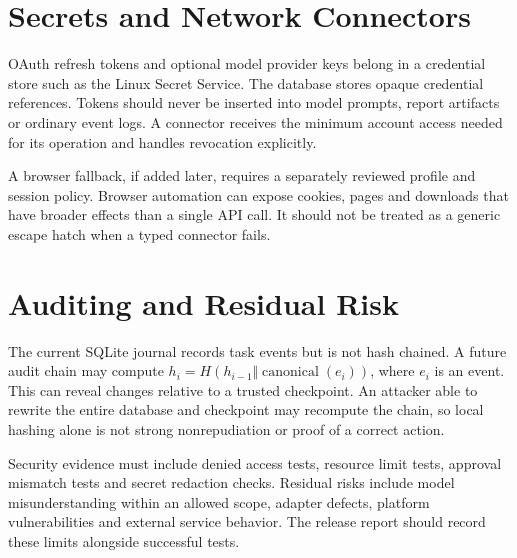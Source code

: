 \section{Secrets and Network Connectors}
OAuth refresh tokens and optional model provider keys belong in a credential store such as the Linux Secret Service. The database stores opaque credential references. Tokens should never be inserted into model prompts, report artifacts or ordinary event logs. A connector receives the minimum account access needed for its operation and handles revocation explicitly.

A browser fallback, if added later, requires a separately reviewed profile and session policy. Browser automation can expose cookies, pages and downloads that have broader effects than a single API call. It should not be treated as a generic escape hatch when a typed connector fails.

\section{Auditing and Residual Risk}
The current SQLite journal records task events but is not hash chained. A future audit chain may compute $h_i=H(h_{i-1}\Vert\operatorname{canonical}(e_i))$, where $e_i$ is an event. This can reveal changes relative to a trusted checkpoint. An attacker able to rewrite the entire database and checkpoint may recompute the chain, so local hashing alone is not strong nonrepudiation or proof of a correct action.

Security evidence must include denied access tests, resource limit tests, approval mismatch tests and secret redaction checks. Residual risks include model misunderstanding within an allowed scope, adapter defects, platform vulnerabilities and external service behavior. The release report should record these limits alongside successful tests.
